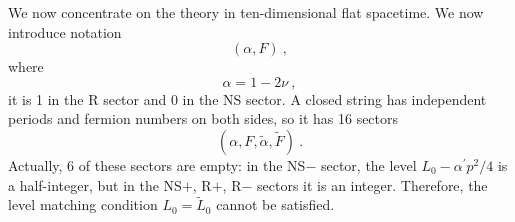 	We now concentrate on the theory in ten-dimensional flat spacetime. We now introduce notation
	\begin{equation}
		(\alpha, F) \:, \label{10.6.1}
	\end{equation}
	where
	\begin{equation}
		\alpha = 1 - 2\nu \:, \label{10.6.2}
	\end{equation}
	it is 1 in the R sector and 0 in the NS sector. A closed string has independent periods and fermion numbers on both sides, so it has 16 sectors
	\begin{equation}
		(\alpha, F,\tilde{\alpha},\tilde{F})\:. \label{10.6.3}
	\end{equation}
	Actually, 6 of these sectors are empty: in the NS$-$ sector, the level $L_{0}-\alpha^{\prime}p^{2}/4$ is a half-integer, but in the NS$+$, R$+$, R$-$ sectors it is an integer. Therefore, the level matching condition $L_{0}=\tilde{L}_{0}$ cannot be satisfied.
	
